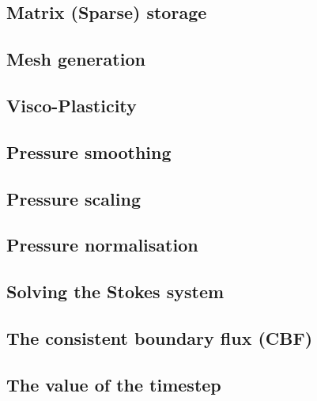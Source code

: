 \documentclass[a4paper]{article}
\begin{document}
\subsection{Matrix (Sparse) storage}  %
\newpage %
\subsection{Mesh generation} \label{subsection_meshes}  %
\newpage %
\subsection{Visco-Plasticity}  %
\newpage %
\subsection{Pressure smoothing \label{psmoothing}}  %
\newpage %
\subsection{Pressure scaling}  %
\newpage %
\subsection{Pressure normalisation\label{ss_pnorm}}  %
\newpage %
\subsection{Solving the Stokes system \label{sec:solvers}}  %
\newpage %
\subsection{The consistent boundary flux (CBF)}  %
\newpage %
\subsection{The value of the timestep}  %
\newpage %
\end{document}
